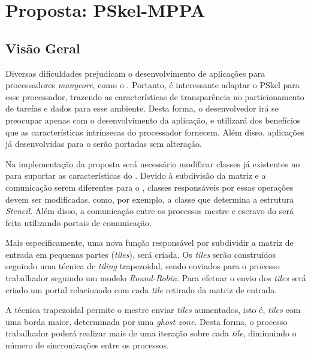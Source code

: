 \chapter{Proposta: PSkel-MPPA}
\label{cha:proposta}

\section{Visão Geral}

Diversas dificuldades prejudicam o desenvolvimento de aplicações para
processadores \textit{manycore}, como o \mppa. Portanto, é interessante adaptar
o \fw PSkel para esse processador, trazendo as características de transparência
no particionamento de tarefas e dados para esse ambiente. Desta forma, o
desenvolvedor irá se preocupar apenas com o desenvolvimento da aplicação, e
utilizará dos benefícios que as características intrínsecas do processador
fornecem. Além disso, aplicações já desenvolvidas para o \fw serão portadas sem
alteração.


Na implementação da proposta será necessário modificar classes já existentes
no \fw para suportar as características do \mppa. Devido à subdivisão da matriz
e a comunicação serem diferentes para o \mppa, classes responsáveis por essas
operações devem ser modificadas, como, por exemplo, a classe que determina a estrutura
\textit{Stencil}. Além disso, a comunicação entre os processos mestre e escravo
do \mppa será feita utilizando portais de comunicação.

Mais especificamente, uma nova função responsável por subdividir a matriz
de entrada em pequenas partes (\textit{tiles}), será criada.
Os \textit{tiles} serão construídos seguindo uma técnica de \textit{tiling}
trapezoidal, sendo enviados para o processo trabalhador seguindo um modelo \textit{Round-Robin}.
Para efetuar o envio dos \textit{tiles} será criado um portal relacionado com
cada \textit{tile} retirado da matriz de entrada.

A técnica trapezoidal permite o mestre enviar \textit{tiles} aumentados, isto é,
\textit{tiles} com uma borda maior, determinada por uma \textit{ghost zone}.
Desta forma, o processo trabalhador poderá realizar mais de uma iteração sobre
cada \textit{tile}, diminuindo o número de sincronizações entre os processos.

